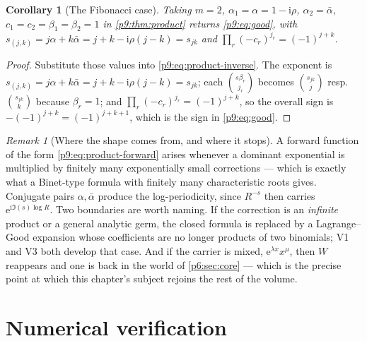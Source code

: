 \documentclass[11pt,a4paper,oneside]{book}
\theoremstyle{plain}
\newtheorem{corollary}[theorem]{Corollary}
\theoremstyle{definition}
\theoremstyle{remark}
\newtheorem{remark}[theorem]{Remark}
\newcommand{\e}{\mathrm{e}}
\newcommand{\ii}{\mathrm{i}}
\newcommand{\Wlam}{W}
\begin{document}
\begin{corollary}[The Fibonacci case]\label{p9:cor:fib-instance}
Taking $m=2$, $\alpha_1=\alpha=1-\ii\rho$, $\alpha_2=\bar\alpha$,
$c_1=c_2=\beta_1=\beta_2=1$ in \cref{p9:thm:product} returns
\eqref{p9:eq:good}, with $s_{(j,k)}=j\alpha+k\bar\alpha=j+k-\ii\rho(j-k)
=s_{jk}$ and $\prod_r(-c_r)^{j_r}=(-1)^{j+k}$.
\end{corollary}

\begin{proof}
Substitute those values into \eqref{p9:eq:product-inverse}.  The exponent is
$s_{(j,k)}=j\alpha+k\bar\alpha=j+k-\ii\rho(j-k)=s_{jk}$; each $\binom{s\beta_r}{j_r}$
becomes $\binom{s_{jk}}{j}$ resp.\ $\binom{s_{jk}}{k}$ because $\beta_r=1$;
and $\prod_r(-c_r)^{j_r}=(-1)^{j+k}$, so the overall sign is
$-(-1)^{j+k}=(-1)^{j+k+1}$, which is the sign in \eqref{p9:eq:good}.
\end{proof}

\begin{remark}[Where the shape comes from, and where it stops]
\label{p9:rem:shape}
A forward function of the form \eqref{p9:eq:product-forward} arises whenever a
dominant exponential is multiplied by finitely many exponentially small
corrections --- which is exactly what a Binet-type formula with finitely many
characteristic roots gives.  Conjugate pairs $\alpha,\bar\alpha$ produce the
log-periodicity, since $R^{-s}$ then carries $\e^{\ii\Im(s)\log R}$.  Two
boundaries are worth naming.  If the correction is an \emph{infinite} product
or a general analytic germ, the closed formula is replaced by a
Lagrange--Good expansion whose coefficients are no longer products of two
binomials; V1 and V3 both develop that case.  And if the carrier is mixed,
$\e^{\lambda x}x^{\mu}$, then $\Wlam$ reappears and one is back in the world of
\cref{p6:sec:core} --- which is the precise point at which this chapter's
subject rejoins the rest of the volume.
\end{remark}

\section{Numerical verification}
\label{p9:sec:numerics}
\end{document}
